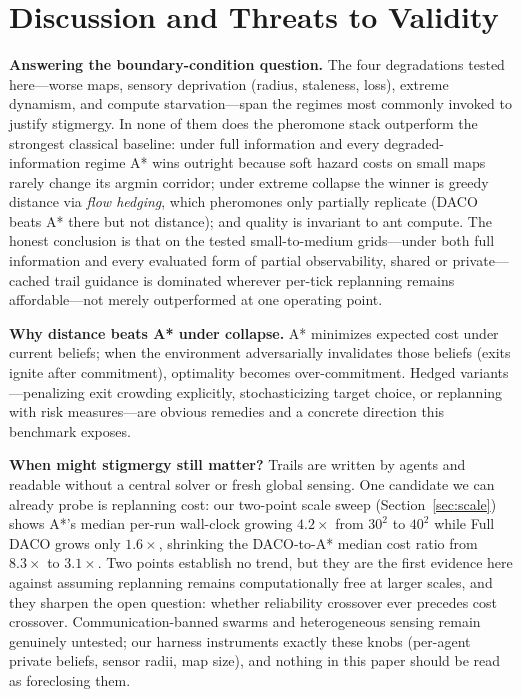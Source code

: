 ﻿\documentclass[conference]{IEEEtran}
\begin{document}
\section{Discussion and Threats to Validity}
\label{sec:discussion}
\textbf{Answering the boundary-condition question.} The four degradations tested here---worse maps, sensory deprivation (radius, staleness, loss), extreme dynamism, and compute starvation---span the regimes most commonly invoked to justify stigmergy. In none of them does the pheromone stack outperform the strongest classical baseline: under full information and every degraded-information regime A* wins outright because soft hazard costs on small maps rarely change its argmin corridor; under extreme collapse the winner is greedy distance via \emph{flow hedging}, which pheromones only partially replicate (DACO beats A* there but not distance); and quality is invariant to ant compute. The honest conclusion is that on the tested small-to-medium grids---under both full information and every evaluated form of partial observability, shared or private---cached trail guidance is dominated wherever per-tick replanning remains affordable---not merely outperformed at one operating point.

\textbf{Why distance beats A* under collapse.} A* minimizes expected cost under current beliefs; when the environment adversarially invalidates those beliefs (exits ignite after commitment), optimality becomes over-commitment. Hedged variants---penalizing exit crowding explicitly, stochasticizing target choice, or replanning with risk measures---are obvious remedies and a concrete direction this benchmark exposes.

\textbf{When might stigmergy still matter?} Trails are written by agents and readable without a central solver or fresh global sensing. One candidate we can already probe is replanning cost: our two-point scale sweep (Section~\ref{sec:scale}) shows A*'s median per-run wall-clock growing $4.2\times$ from $30^2$ to $40^2$ while Full DACO grows only $1.6\times$, shrinking the DACO-to-A* median cost ratio from $8.3\times$ to $3.1\times$. Two points establish no trend, but they are the first evidence here against assuming replanning remains computationally free at larger scales, and they sharpen the open question: whether reliability crossover ever precedes cost crossover. Communication-banned swarms and heterogeneous sensing remain genuinely untested; our harness instruments exactly these knobs (per-agent private beliefs, sensor radii, map size), and nothing in this paper should be read as foreclosing them.
\end{document}
